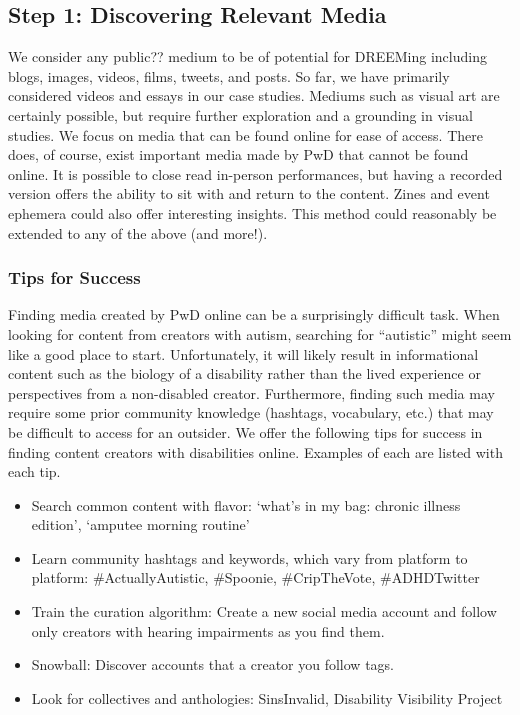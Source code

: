 \subsection{Step 1: Discovering Relevant Media}
We consider any {\color{red}public??} medium to be of potential for DREEMing including blogs, images, videos, films, tweets, and posts. So far, we have primarily considered {\color{red}videos and essays} in our case studies. Mediums such as visual art are certainly possible, but require further exploration and a grounding in visual studies.  We focus on media that can be found online for ease of access. There does, of course, exist important media made by PwD that cannot be found online. It is possible to close read in-person performances, but having a recorded version offers the ability to sit with and return to the content. Zines and event ephemera could also offer interesting insights. This method could reasonably be extended to any of the above (and more!).

\subsubsection{Tips for Success}
Finding media created by PwD online can be a surprisingly difficult task. When looking for content from creators with autism, searching for ``autistic'' might seem like a good place to start. Unfortunately, it will likely result in informational content such as the biology of a disability rather than the lived experience or perspectives from a non-disabled creator. Furthermore, finding such media may require some prior community knowledge (hashtags, vocabulary, etc.) that may be difficult to access for an outsider. We offer the following tips for success in finding content creators with disabilities online. Examples of each are listed with each tip. 
 
\begin{itemize}
  \item Search common content with flavor: `what's in my bag: chronic illness edition', `amputee morning routine'
  \item Learn community hashtags and keywords, which vary from platform to platform: \#ActuallyAutistic, \#Spoonie, \#CripTheVote, \#ADHDTwitter
  \item Train the curation algorithm: Create a new social media account and follow only creators with hearing impairments as you find them. 
  \item Snowball: Discover accounts that a creator you follow tags. 
  \item Look for collectives and anthologies: SinsInvalid, Disability Visibility Project
\end{itemize}

